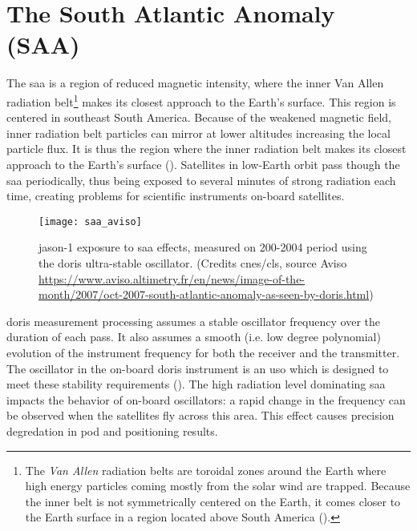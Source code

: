 \section{The South Atlantic Anomaly (SAA)}\label{sec:saa}

\iffalse
https://www.aviso.altimetry.fr/en/news/image-of-the-month/2007/oct-2007-south-atlantic-anomaly-as-seen-by-doris.html
https://ids-doris.org/images/documents/report/ids_workshop_2010/IDS10_s1_Stepanek_Spot5SAA.pdf
\fi

The \gls{saa} is a region of reduced magnetic intensity, where 
the inner Van Allen radiation belt\footnote{The \emph{Van Allen} radiation belts 
are toroidal zones around the Earth where high energy particles coming mostly 
from the solar wind are trapped. Because the inner belt is not symmetrically 
centered on the Earth, it comes closer to the Earth surface in a region 
located above South America (\cite{Jalabert2018}).} makes its closest approach 
to the Earth's surface. This region is centered in southeast South America. Because 
of the weakened magnetic 
field, inner radiation belt particles can mirror at lower altitudes increasing 
the local particle flux. It is thus the region where the inner radiation belt 
makes its closest approach to the Earth's surface (\cite{Anderson2018}). 
Satellites in low-Earth orbit pass though the \gls{saa} periodically, thus being 
exposed to several minutes of strong radiation each time, creating problems for 
scientific instruments on-board satellites.

\begin{figure}
    \centering
    \texttt{[image: saa\_aviso]}
    \caption{\gls{jason}-1 exposure to \gls{saa} effects, measured on 200-2004 
      period using the \gls{doris} ultra-stable oscillator. (Credits \gls{cnes}/\gls{cls}, 
      source Aviso \url{https://www.aviso.altimetry.fr/en/news/image-of-the-month/2007/oct-2007-south-atlantic-anomaly-as-seen-by-doris.html})}
    \label{fig:saa-aviso}
\end{figure}

\gls{doris} measurement processing assumes a stable oscillator frequency over 
the duration of each pass. It also assumes a smooth (i.e. low degree polynomial) 
evolution of the instrument frequency for both the receiver and the transmitter. 
The oscillator in the on-board \gls{doris} instrument is an \gls{uso} which is 
designed to meet these stability requirements (\cite{Jalabert2018}).
The high radiation level dominating \gls{saa} impacts the behavior of on-board 
oscillators: a rapid change in the frequency can be observed when the satellites 
fly across this area. This effect causes precision degredation in \gls{pod} and 
positioning results.

